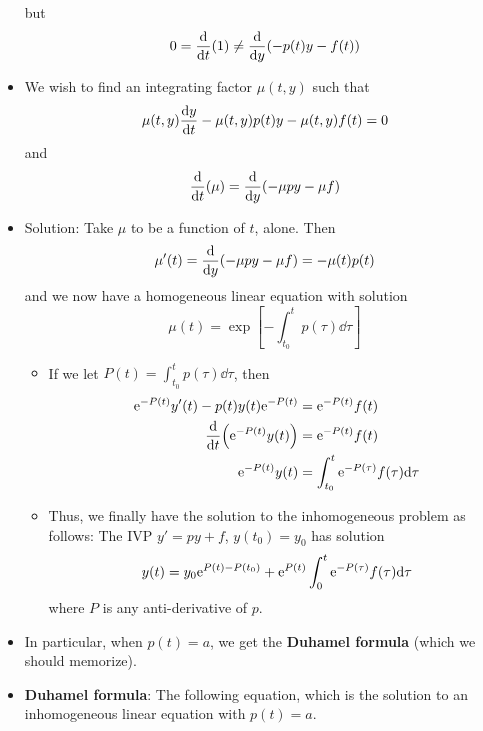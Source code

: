 \documentclass[../notes.tex]{subfiles}
\begin{document}
\begin{itemize}
\begin{equation*}
    \end{equation*}
    but
    \begin{equation*}
        0 = \dv{t}(1) \neq \dv{y}(-p(t)y-f(t))
    \end{equation*}
    \item We wish to find an integrating factor $\mu(t,y)$ such that
    \begin{equation*}
        \mu(t,y)\dv{y}{t}-\mu(t,y)p(t)y-\mu(t,y)f(t) = 0
    \end{equation*}
    and
    \begin{equation*}
        \dv{t}(\mu) = \dv{y}(-\mu py-\mu f)
    \end{equation*}
    \item Solution: Take $\mu$ to be a function of $t$, alone. Then
    \begin{equation*}
        \mu'(t) = \dv{y}(-\mu py-\mu f) = -\mu(t)p(t)
    \end{equation*}
    and we now have a homogeneous linear equation with solution
    \begin{equation*}
        \mu(t) = \exp[-\int_{t_0}^tp(\tau)\dd\tau]
    \end{equation*}
    \begin{itemize}
        \item If we let $P(t)=\int_{t_0}^tp(\tau)\dd\tau$, then
        \begin{align*}
            \e[-P(t)]y'(t)-p(t)y(t)\e[-P(t)] &= \e[-P(t)]f(t)\\
            \dv{t}(\e[-P(t)]y(t)) &= \e[-P(t)]f(t)\\
            \e[-P(t)]y(t) &= \int_{t_0}^t\e[-P(\tau)]f(\tau)\dd\tau
        \end{align*}
        \item Thus, we finally have the solution to the inhomogeneous problem as follows: The IVP $y'=py+f$, $y(t_0)=y_0$ has solution
        \begin{equation*}
            y(t) = y_0\e[P(t)-P(t_0)]+\e[P(t)]\int_0^t\e[-P(\tau)]f(\tau)\dd\tau
        \end{equation*}
        where $P$ is any anti-derivative of $p$.
    \end{itemize}
    \item In particular, when $p(t)=a$, we get the \textbf{Duhamel formula} (which we should memorize).
    \item \textbf{Duhamel formula}: The following equation, which is the solution to an inhomogeneous linear equation with $p(t)=a$.
    \begin{equation*}

\end{equation*}
\end{itemize}
\end{document}
